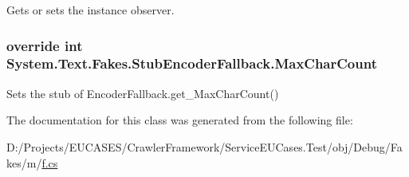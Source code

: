 Gets or sets the instance observer.

\hypertarget{class_system_1_1_text_1_1_fakes_1_1_stub_encoder_fallback_ada1fb31f762ff1fdcf20dba514ad75d2}{
\subsubsection[{Max\-Char\-Count}]{\setlength{\rightskip}{0pt plus 5cm}override int System.\-Text.\-Fakes.\-Stub\-Encoder\-Fallback.\-Max\-Char\-Count\hspace{0.3cm}{\ttfamily [get]}}}\label{class_system_1_1_text_1_1_fakes_1_1_stub_encoder_fallback_ada1fb31f762ff1fdcf20dba514ad75d2}


Sets the stub of Encoder\-Fallback.\-get\-\_\-\-Max\-Char\-Count()



The documentation for this class was generated from the following file\-:\begin{DoxyCompactItemize}
\item 
D\-:/\-Projects/\-E\-U\-C\-A\-S\-E\-S/\-Crawler\-Framework/\-Service\-E\-U\-Cases.\-Test/obj/\-Debug/\-Fakes/m/\hyperlink{m_2f_8cs}{f.\-cs}\end{DoxyCompactItemize}
